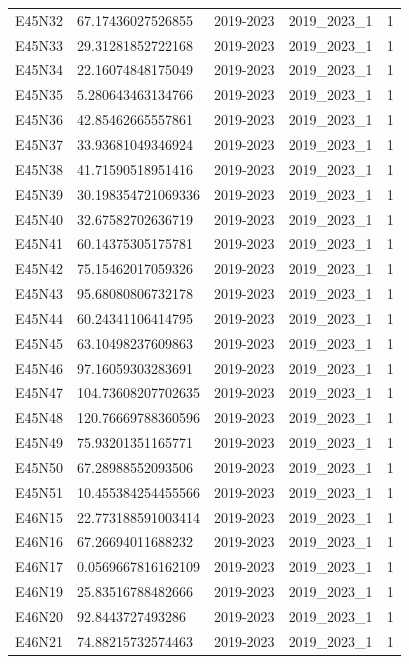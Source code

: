 \begin{landscape}
\begin{longtable}{lllll}
E45N32 & 67.17436027526855 & 2019-2023 & 2019\_2023\_1 & 1 \\
E45N33 & 29.31281852722168 & 2019-2023 & 2019\_2023\_1 & 1 \\
E45N34 & 22.16074848175049 & 2019-2023 & 2019\_2023\_1 & 1 \\
E45N35 & 5.280643463134766 & 2019-2023 & 2019\_2023\_1 & 1 \\
E45N36 & 42.85462665557861 & 2019-2023 & 2019\_2023\_1 & 1 \\
E45N37 & 33.93681049346924 & 2019-2023 & 2019\_2023\_1 & 1 \\
E45N38 & 41.71590518951416 & 2019-2023 & 2019\_2023\_1 & 1 \\
E45N39 & 30.198354721069336 & 2019-2023 & 2019\_2023\_1 & 1 \\
E45N40 & 32.67582702636719 & 2019-2023 & 2019\_2023\_1 & 1 \\
E45N41 & 60.14375305175781 & 2019-2023 & 2019\_2023\_1 & 1 \\
E45N42 & 75.15462017059326 & 2019-2023 & 2019\_2023\_1 & 1 \\
E45N43 & 95.68080806732178 & 2019-2023 & 2019\_2023\_1 & 1 \\
E45N44 & 60.24341106414795 & 2019-2023 & 2019\_2023\_1 & 1 \\
E45N45 & 63.10498237609863 & 2019-2023 & 2019\_2023\_1 & 1 \\
E45N46 & 97.16059303283691 & 2019-2023 & 2019\_2023\_1 & 1 \\
E45N47 & 104.73608207702635 & 2019-2023 & 2019\_2023\_1 & 1 \\
E45N48 & 120.76669788360596 & 2019-2023 & 2019\_2023\_1 & 1 \\
E45N49 & 75.93201351165771 & 2019-2023 & 2019\_2023\_1 & 1 \\
E45N50 & 67.28988552093506 & 2019-2023 & 2019\_2023\_1 & 1 \\
E45N51 & 10.455384254455566 & 2019-2023 & 2019\_2023\_1 & 1 \\
E46N15 & 22.773188591003414 & 2019-2023 & 2019\_2023\_1 & 1 \\
E46N16 & 67.26694011688232 & 2019-2023 & 2019\_2023\_1 & 1 \\
E46N17 & 0.0569667816162109 & 2019-2023 & 2019\_2023\_1 & 1 \\
E46N19 & 25.83516788482666 & 2019-2023 & 2019\_2023\_1 & 1 \\
E46N20 & 92.8443727493286 & 2019-2023 & 2019\_2023\_1 & 1 \\
E46N21 & 74.88215732574463 & 2019-2023 & 2019\_2023\_1 & 1 \\

\end{longtable}
\end{landscape}
